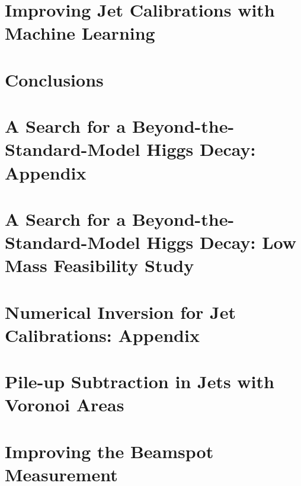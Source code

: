 \documentclass[12pt]{report}
\begin{document}
\chapter{Improving Jet Calibrations with Machine Learning}
\label{ch:GenNI}

\chapter{Conclusions}
\label{ch:Conclusion}

\appendix

\chapter{A Search for a Beyond-the-Standard-Model Higgs Decay: Appendix}
\label{ch:HBSM_app}
\chapter{A Search for a Beyond-the-Standard-Model Higgs Decay: Low Mass Feasibility Study}
\label{ch:HBSM_lowmass_app}
\chapter{Numerical Inversion for Jet Calibrations: Appendix}
\label{ch:NI_app}
\chapter{Pile-up Subtraction in Jets with Voronoi Areas}
\label{ch:Voronoi}
\chapter{Improving the Beamspot Measurement}
\label{ch:Beamspot}

 
  
{}
\end{document}
